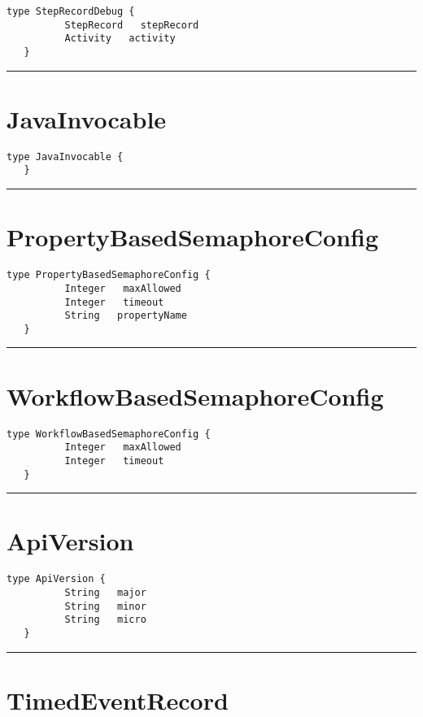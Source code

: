 \begin{lstlisting}[style=nonumbers]
   type StepRecordDebug {
          StepRecord   stepRecord
          Activity   activity
   }
\end{lstlisting}

\rule{12cm}{2pt}
\section{JavaInvocable}
\label{type:JavaInvocable}

\begin{lstlisting}[style=nonumbers]
   type JavaInvocable {
   }
\end{lstlisting}

\rule{12cm}{2pt}
\section{PropertyBasedSemaphoreConfig}
\label{type:PropertyBasedSemaphoreConfig}

\begin{lstlisting}[style=nonumbers]
   type PropertyBasedSemaphoreConfig {
          Integer   maxAllowed
          Integer   timeout
          String   propertyName
   }
\end{lstlisting}

\rule{12cm}{2pt}
\section{WorkflowBasedSemaphoreConfig}
\label{type:WorkflowBasedSemaphoreConfig}

\begin{lstlisting}[style=nonumbers]
   type WorkflowBasedSemaphoreConfig {
          Integer   maxAllowed
          Integer   timeout
   }
\end{lstlisting}

\rule{12cm}{2pt}
\section{ApiVersion}
\label{type:ApiVersion}

\begin{lstlisting}[style=nonumbers]
   type ApiVersion {
          String   major
          String   minor
          String   micro
   }
\end{lstlisting}

\rule{12cm}{2pt}
\section{TimedEventRecord}
\label{type:TimedEventRecord}

